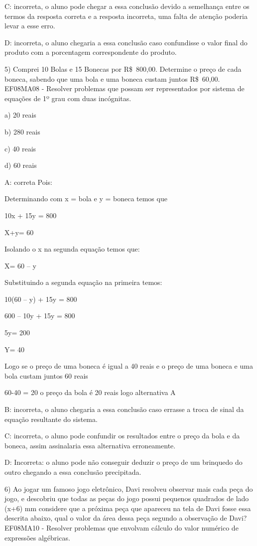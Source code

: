 C: incorreta, o aluno pode chegar a essa conclusão devido a semelhança
entre os termos da resposta correta e a resposta incorreta, uma falta de
atenção poderia levar a esse erro.

D: incorreta, o aluno chegaria a essa conclusão caso confundisse o valor
final do produto com a porcentagem correspondente do produto.

5) Comprei 10 Bolas e 15 Bonecas por R\$~800,00. Determine o preço de
cada boneca, sabendo que uma bola e uma boneca custam juntos R\$~60,00.
EF08MA08 - Resolver problemas que possam ser representados por sistema
de equações de 1º grau com duas incógnitas.

a) 20 reais

b) 280 reais

c) 40 reais

d) 60 reais

A: correta Pois:

Determinando com x = bola e y = boneca temos que

10x + 15y = 800

X+y= 60

Isolando o x na segunda equação temos que:

X= 60 -- y

Substituindo a segunda equação na primeira temos:

10(60 -- y) + 15y = 800

600 -- 10y + 15y = 800

5y= 200

Y= 40

Logo se o preço de uma boneca é igual a 40 reais e o preço de uma boneca
e uma bola custam juntos 60 reais

60-40 = 20 o preço da bola é 20 reais logo alternativa A

B: incorreta, o aluno chegaria a essa conclusão caso errasse a troca de
sinal da equação resultante do sistema.

C: incorreta, o aluno pode confundir os resultados entre o preço da bola
e da boneca, assim assinalaria essa alternativa erroneamente.

D: Incorreta: o aluno pode não conseguir deduzir o preço de um brinquedo
do outro chegando a essa conclusão precipitada.

6) Ao jogar um famoso jogo eletrônico, Davi resolveu observar mais cada
peça do jogo, e descobriu que todas as peças do jogo possui pequenos
quadrados de lado (x+6) mm considere que a próxima peça que apareceu na
tela de Davi fosse essa descrita abaixo, qual o valor da área dessa peça
segundo a observação de Davi? EF08MA10 - Resolver problemas que envolvam
cálculo do valor numérico de expressões algébricas.

